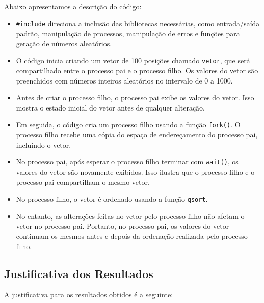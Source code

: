 \documentclass[
	12pt,				%
	openright,			%
	oneside,			%
	a4paper,			%
	chapter=TITLE,		%
	english,			%
	french,				%
	spanish,			%
	brazil				%
	]{abntex2}
\theoremstyle{definition}
\begin{document}
Abaixo apresentamos a descrição do código: 

\begin{itemize}
        \item \texttt{\#include} direciona a inclusão das bibliotecas necessárias, como entrada/saída padrão, manipulação de processos, manipulação de erros e funções para geração de números aleatórios.
    
        \item O código inicia criando um vetor de 100 posições chamado \texttt{vetor}, que será compartilhado entre o processo pai e o processo filho. Os valores do vetor são preenchidos com números inteiros aleatórios no intervalo de 0 a 1000.
    
        \item Antes de criar o processo filho, o processo pai exibe os valores do vetor. Isso mostra o estado inicial do vetor antes de qualquer alteração.
    
        \item Em seguida, o código cria um processo filho usando a função \texttt{fork()}. O processo filho recebe uma cópia do espaço de endereçamento do processo pai, incluindo o vetor.
    
        \item No processo pai, após esperar o processo filho terminar com \texttt{wait()}, os valores do vetor são novamente exibidos. Isso ilustra que o processo filho e o processo pai compartilham o mesmo vetor.
    
        \item No processo filho, o vetor é ordenado usando a função \texttt{qsort}.
    
        \item No entanto, as alterações feitas no vetor pelo processo filho não afetam o vetor no processo pai. 
    Portanto, no processo pai, os valores do vetor continuam os mesmos antes e depois da ordenação realizada pelo processo filho.
\end{itemize}



\subsection{Justificativa dos Resultados}

A justificativa para os resultados obtidos é a seguinte:
\end{document}
